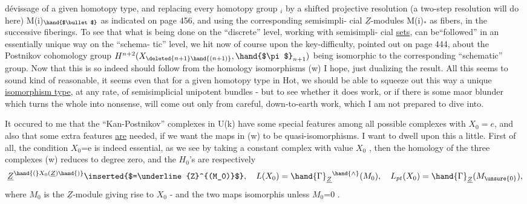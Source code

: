 dévissage of a given homotopy type,  and replacing every homotopy group \hand{$\pi$}$_i$
by a shifted projective resolution (a two-step resolution will do here)
M(i)$_{\hand{$\bullet$}}$\hand{,}  as indicated on page 456,  and using the corresponding semisimpli-%
cial $\underline{Z}$-modules  M(i)$_*$  as fibers,  in the successive fiberings.  To see
that what is being done on the ``discrete'' level,  working with semisimpli-%
cial \uline{sets},  can be``followed'' in an essentially unique way on the ``schema-%
tic'' level,  we hit now of course upon the key-difficulty,  pointed out
on page 444,  about the Postnikov cohomology group $H^{n+2}(X_{\deleted{n+1}\hand{(n+1)}},\hand{$\pi$}_{n+1})$
being isomorphic to the corresponding ``schematic'' group.  Now that this is
so indeed should follow from the homology isomorphisms (w) I hope,
 just dualizing the result.  All this seems to
sound kind of reasonable,  it seems even that for a given homotopy type
in Hot,  we should be able to squeeze out this way a unique \uline{isomorphism
type},  at any rate,  of semisimplicial unipotent bundles  -  but to see
whether it does work,  or if there is some maor blunder which turns
the whole into nonsense,  will come out only from careful, down-to-earth
work,  which I am not prepared to dive into.

It occured to me that the ``Kan-Postnikov'' complexes in U(k) have
some special features among all possible complexes with $X_0 = e$,  and also
that some extra features \uline{are}  needed,  if we want the maps in (w) to be
quasi-isomorphisms.  I want to dwell upon this a little.  First of all,
the condition  $X_0$=e is indeed essential,  as we see by taking a constant
complex with value $X_0$ ,  then the homology of the three complexes
(w)  reduces to degree zero,  and the $H_0$'s are respectively
\[ \underline{Z}^{\hand{(}X_0(\underline{Z})\hand{)}}\inserted{$=\underline{Z}^{(M_0)}$} ,\quad L(X_0) = \hand{\Gamma}_{\underline{Z}}{}^{\hand{\wedge}}(M_0) ,\quad L_{pt}(X_0) = \hand{\Gamma}_{\underline{Z}}(M_{\unsure{0}}) , \]
where $M_0$ is the $\underline{Z}$-module giving rise to $X_0$  -  and  the two maps 
 isomorphis\hand{,} unless $M_0$=0 .

